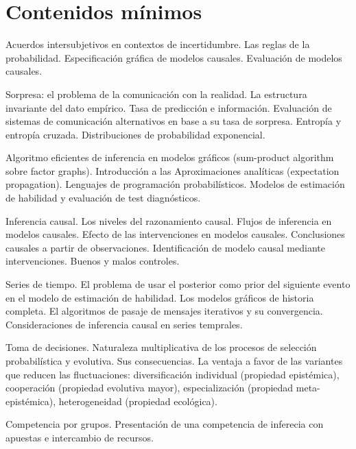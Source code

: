 \documentclass[10pt]{article}
\begin{document}
\section{Contenidos mínimos}

Acuerdos intersubjetivos en contextos de incertidumbre. Las reglas de la probabilidad. Especificación gráfica de modelos causales. Evaluación de modelos causales.

Sorpresa: el problema de la comunicación con la realidad. La estructura invariante del dato empírico. Tasa de predicción e información. Evaluación de sistemas de comunicación alternativos en base a su tasa de sorpresa. Entropía y entropía cruzada. Distribuciones de probabilidad exponencial.

Algoritmo eficientes de inferencia en modelos gráficos (sum-product algorithm sobre factor graphs). Introducción a las Aproximaciones analíticas (expectation propagation). Lenguajes de programación probabilísticos. Modelos de estimación de habilidad y evaluación de test diagnósticos.

Inferencia causal. Los niveles del razonamiento causal. Flujos de inferencia en modelos causales. Efecto de las intervenciones en modelos causales. Conclusiones causales a partir de observaciones. Identificación de modelo causal mediante intervenciones. Buenos y malos controles.

Series de tiempo. El problema de usar el posterior como prior del siguiente evento en el modelo de estimación de habilidad. Los modelos gráficos de historia completa. El algoritmos de pasaje de mensajes iterativos y su convergencia. Consideraciones de inferencia causal en series temprales.

Toma de decisiones. Naturaleza multiplicativa de los procesos de selección probabilística y evolutiva. Sus consecuencias. La ventaja a favor de las variantes que reducen las fluctuaciones: diversificación individual (propiedad epistémica), cooperación (propiedad evolutiva mayor), especialización (propiedad meta-epistémica), heterogeneidad (propiedad ecológica).

Competencia por grupos. Presentación de una competencia de inferecia con apuestas e intercambio de recursos.
\end{document}
